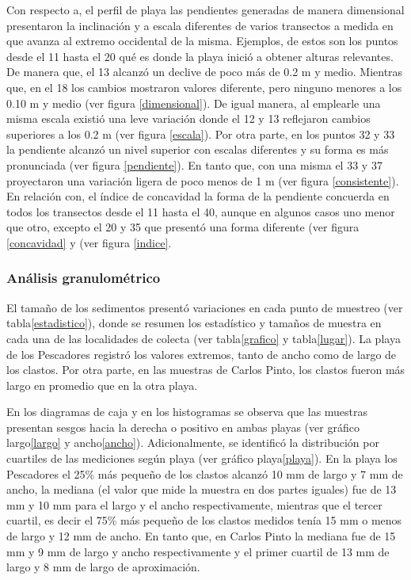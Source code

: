 \documentclass[11pt,]{article}
\begin{document}
Con respecto a, el perfil de playa las pendientes generadas de manera
dimensional presentaron la inclinación y a escala diferentes de varios
transectos a medida en que avanza al extremo occidental de la misma.
Ejemplos, de estos son los puntos desde el 11 hasta el 20 qué es donde
la playa inició a obtener alturas relevantes. De manera que, el 13
alcanzó un declive de poco más de 0.2 m y medio. Mientras que, en el 18
los cambios mostraron valores diferente, pero ninguno menores a los 0.10
m y medio (ver figura \ref{dimensional}). De igual manera, al emplearle
una misma escala existió una leve variación donde el 12 y 13 reflejaron
cambios superiores a los 0.2 m (ver figura \ref{escala}). Por otra
parte, en los puntos 32 y 33 la pendiente alcanzó un nivel superior con
escalas diferentes y su forma es más pronunciada (ver figura
\ref{pendiente}). En tanto que, con una misma el 33 y 37 proyectaron una
variación ligera de poco menos de 1 m (ver figura \ref{consistente}). En
relación con, el índice de concavidad la forma de la pendiente concuerda
en todos los transectos desde el 11 hasta el 40, aunque en algunos casos
uno menor que otro, excepto el 20 y 35 que presentó una forma diferente
(ver figura \ref{concavidad} y (ver figura \ref{indice}.

\subsubsection{Análisis
granulométrico}\label{anuxe1lisis-granulomuxe9trico}

El tamaño de los sedimentos presentó variaciones en cada punto de
muestreo (ver tabla\ref{estadistico}), donde se resumen los estadístico
y tamaños de muestra en cada una de las localidades de colecta (ver
tabla\ref{grafico} y tabla\ref{lugar}). La playa de los Pescadores
registró los valores extremos, tanto de ancho como de largo de los
clastos. Por otra parte, en las muestras de Carlos Pinto, los clastos
fueron más largo en promedio que en la otra playa.

En los diagramas de caja y en los histogramas se observa que las
muestras presentan sesgos hacia la derecha o positivo en ambas playas
(ver gráfico largo\ref{largo} y ancho\ref{ancho}). Adicionalmente, se
identificó la distribución por cuartiles de las mediciones según playa
(ver gráfico playa\ref{playa}). En la playa los Pescadores el 25\% más
pequeño de los clastos alcanzó 10 mm de largo y 7 mm de ancho, la
mediana (el valor que mide la muestra en dos partes iguales) fue de 13
mm y 10 mm para el largo y el ancho respectivamente, mientras que el
tercer cuartil, es decir el 75\% más pequeño de los clastos medidos
tenía 15 mm o menos de largo y 12 mm de ancho. En tanto que, en Carlos
Pinto la mediana fue de 15 mm y 9 mm de largo y ancho respectivamente y
el primer cuartil de 13 mm de largo y 8 mm de largo de aproximación.
\end{document}
